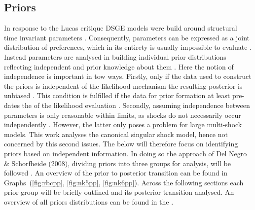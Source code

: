 \documentclass[12pt,a4paper,english]{article} %
\begin{document}
			
	\subsection{Priors} \label{priors}
	In response to the Lucas critique \ac{DSGE} models were build around structural time invariant parameters \cite{lucas_jr_tobin_1981}. Consequently, parameters can be expressed as a joint distribution of preferences, which in its entirety is usually impossible to evaluate \cite{del_negro_forming_2008}. Instead parameters are analysed in building individual prior distributions reflecting independent and prior knowledge about them \cite{del_negro_forming_2008}. Here the notion of independence is important in tow ways. Firstly, only if the data used to construct the priors is independent of the likelihood mechanism the resulting posterior is unbiased \cite{del_negro_forming_2008}. This condition is fulfilled if the data for prior formation at least pre-dates the of the likelihood evaluation \cite{herbst_bayesian_2016}. Secondly, assuming independence between parameters is only reasonable within limits, as shocks do not necessarily occur independently \cite{herbst_bayesian_2016}. However, the latter only poses a problem for large multi-shock models. This work analyses the canonical singular shock model, hence not concerned by this second issues. The below will therefore focus on identifying priors based on independent information. In doing so the approach of Del Negro \& Schorfheide (2008), dividing priors into three groups for analysis, will be followed \cite{del_negro_forming_2008}. An overview of the prior to posterior transition can be found in Graphs~(\ref{fig:rbcpp}, \ref{fig:nk5pp}, \ref{fig:nk6pp}). Across the following sections each prior group will be briefly outlined and its posterior transition analysed. An overview of all priors distributions can be found in the . 
	
\end{document}
